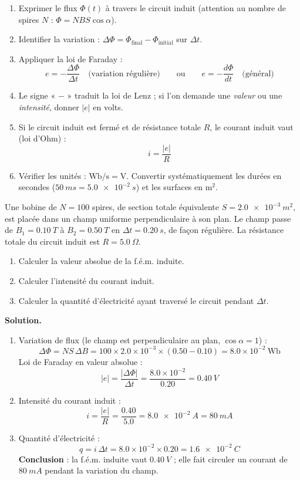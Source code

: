 \documentclass[11pt]{article}
\begin{document}
\begin{methode}
\begin{enumerate}
\item Exprimer le flux $\Phi(t)$ à travers le circuit induit (attention au nombre de spires $N$ : $\Phi = NBS\cos\alpha$).
\item Identifier la variation : $\Delta\Phi = \Phi_{\text{final}} - \Phi_{\text{initial}}$ sur $\Delta t$.
\item Appliquer la loi de Faraday :
\[ e = -\dfrac{\Delta\Phi}{\Delta t} \quad \text{(variation régulière)} \qquad \text{ou} \qquad e = -\dfrac{d\Phi}{dt} \quad \text{(général)} \]
\item Le signe « $-$ » traduit la loi de Lenz ; si l'on demande une \emph{valeur} ou une \emph{intensité}, donner $|e|$ en volts.
\item Si le circuit induit est fermé et de résistance totale $R$, le courant induit vaut (loi d'Ohm) :
\[ i = \dfrac{|e|}{R} \]
\item Vérifier les unités : $\mathrm{Wb}/\mathrm{s} = \mathrm{V}$. Convertir systématiquement les durées en secondes ($\SI{50}{ms} = \SI{5,0e-2}{s}$) et les surfaces en $\mathrm{m}^2$.
\end{enumerate}
\end{methode}

\begin{exoresolu}
Une bobine de $N = 100$ spires, de section totale équivalente $S = \SI{2,0e-3}{m^2}$, est placée dans un champ uniforme perpendiculaire à son plan. Le champ passe de $B_1 = \SI{0,10}{T}$ à $B_2 = \SI{0,50}{T}$ en $\Delta t = \SI{0,20}{s}$, de façon régulière. La résistance totale du circuit induit est $R = \SI{5,0}{\Omega}$.
\begin{enumerate}
\item Calculer la valeur absolue de la f.é.m. induite.
\item Calculer l'intensité du courant induit.
\item Calculer la quantité d'électricité ayant traversé le circuit pendant $\Delta t$.
\end{enumerate}
\tcblower
\textbf{Solution.}
\begin{enumerate}
\item Variation de flux (le champ est perpendiculaire au plan, $\cos\alpha = 1$) :
\[ \Delta\Phi = N S\,\Delta B = 100 \times \num{2,0}\times 10^{-3} \times (\num{0,50} - \num{0,10}) = \num{8,0}\times 10^{-2}\ \mathrm{Wb} \]
Loi de Faraday en valeur absolue :
\[ |e| = \dfrac{|\Delta\Phi|}{\Delta t} = \dfrac{\num{8,0}\times 10^{-2}}{\num{0,20}} = \SI{0,40}{V} \]
\item Intensité du courant induit :
\[ i = \dfrac{|e|}{R} = \dfrac{\num{0,40}}{\num{5,0}} = \SI{8,0e-2}{A} = \SI{80}{mA} \]
\item Quantité d'électricité :
\[ q = i\,\Delta t = \num{8,0}\times 10^{-2} \times \num{0,20} = \SI{1,6e-2}{C} \]
\textbf{Conclusion} : la f.é.m. induite vaut $\SI{0,40}{V}$ ; elle fait circuler un courant de $\SI{80}{mA}$ pendant la variation du champ.
\end{enumerate}
\end{exoresolu}
\end{document}
